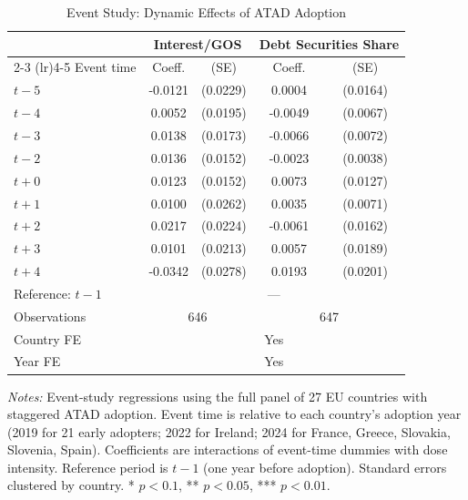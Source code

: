 \begin{table}[t]
\centering
\caption{Event Study: Dynamic Effects of ATAD Adoption}
\label{tab:eventstudy}
\small
\begin{tabular}{lcccc}
\toprule
& \multicolumn{2}{c}{Interest/GOS} & \multicolumn{2}{c}{Debt Securities Share} \\
\cmidrule(lr){2-3} \cmidrule(lr){4-5}
Event time & Coeff. & (SE) & Coeff. & (SE) \\
\midrule
$t - 5$ & -0.0121 & (0.0229) & 0.0004 & (0.0164) \\
$t - 4$ & 0.0052 & (0.0195) & -0.0049 & (0.0067) \\
$t - 3$ & 0.0138 & (0.0173) & -0.0066 & (0.0072) \\
$t - 2$ & 0.0136 & (0.0152) & -0.0023 & (0.0038) \\
$t + 0$ & 0.0123 & (0.0152) & 0.0073 & (0.0127) \\
$t + 1$ & 0.0100 & (0.0262) & 0.0035 & (0.0071) \\
$t + 2$ & 0.0217 & (0.0224) & -0.0061 & (0.0162) \\
$t + 3$ & 0.0101 & (0.0213) & 0.0057 & (0.0189) \\
$t + 4$ & -0.0342 & (0.0278) & 0.0193 & (0.0201) \\
\midrule
Reference: $t - 1$ & \multicolumn{4}{c}{---} \\
Observations & \multicolumn{2}{c}{646} & \multicolumn{2}{c}{647} \\
Country FE & \multicolumn{4}{c}{Yes} \\
Year FE & \multicolumn{4}{c}{Yes} \\
\bottomrule
\end{tabular}
\begin{tablenotes}
\item \textit{Notes:} Event-study regressions using the full panel of 27 EU countries with staggered ATAD adoption. Event time is relative to each country's adoption year (2019 for 21 early adopters; 2022 for Ireland; 2024 for France, Greece, Slovakia, Slovenia, Spain). Coefficients are interactions of event-time dummies with dose intensity. Reference period is $t-1$ (one year before adoption). Standard errors clustered by country. * $p<0.1$, ** $p<0.05$, *** $p<0.01$.
\end{tablenotes}
\end{table}

